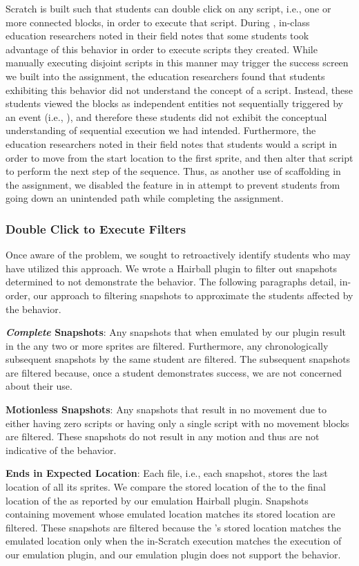 Scratch is built such that students can double click on any script, i.e., one
or more connected blocks, in order to execute that script. During \sone{},
in-class education researchers noted in their field notes that some students
took advantage of this behavior in order to execute scripts they created. While
manually executing disjoint scripts in this manner may trigger the success
screen we built into the assignment, the education researchers found that
students exhibiting this behavior did not understand the concept of a
script. Instead, these students viewed the blocks as independent entities not
sequentially triggered by an event (i.e., \netclicked{}), and therefore these
students did not exhibit the conceptual understanding of sequential execution
we had intended. Furthermore, the education researchers noted in their field
notes that students would \dce{} a script in order to move from the start
location to the first sprite, and then alter that script to perform the next
step of the sequence. Thus, as another use of scaffolding in the assignment, we
disabled the \dce{} feature in \stwo{} in attempt to prevent students from
going down an unintended path while completing the assignment.

\subsubsection{Double Click to Execute Filters}
Once aware of the problem, we sought to retroactively identify students who may
have utilized this \dce{} approach. We wrote a Hairball plugin to filter out
snapshots determined to not demonstrate the \dce{} behavior. The following
paragraphs detail, in-order, our approach to filtering snapshots to approximate
the students affected by the \dce{} behavior.

\textbf{\emph{Complete} Snapshots}: Any snapshots that when emulated by our
plugin result in the \net{}  any two or more sprites are
filtered. Furthermore, any chronologically subsequent snapshots by the same
student are filtered. The subsequent snapshots are filtered because, once a
student demonstrates success, we are not concerned about their \dce{} use.

\textbf{Motionless Snapshots}: Any snapshots that result in no movement due to
either having zero scripts or having only a single \netclicked{} script with no
movement blocks are filtered. These snapshots do not result in any motion and
thus are not indicative of the \dce{} behavior.

\textbf{\net{} Ends in Expected Location}: Each \sprogram{} file, i.e., each
snapshot, stores the last location of all its sprites. We compare the stored
location of the \net{} to the final location of the \net{} as reported by our
\net{} emulation Hairball plugin. Snapshots containing movement whose emulated
\net{} location matches its stored location are filtered. These snapshots are
filtered because the \net{}'s stored location matches the emulated location
only when the in-Scratch execution matches the execution of our emulation
plugin, and our emulation plugin does not support the \dce{} behavior.

